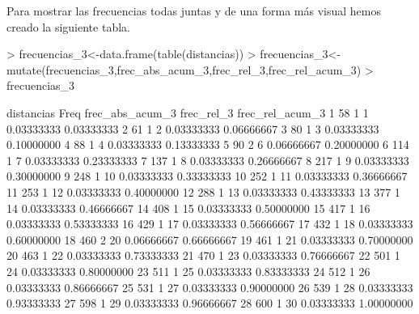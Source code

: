 \documentclass[a4paper]{article}
\begin{document}
Para mostrar las frecuencias todas juntas y de una forma más visual hemos creado la siguiente tabla.
\begin{Schunk}
\begin{Sinput}
> frecuencias_3<-data.frame(table(distancias))
> frecuencias_3<-mutate(frecuencias_3,frec_abs_acum_3,frec_rel_3,frec_rel_acum_3)
> frecuencias_3
\end{Sinput}
\begin{Soutput}
   distancias Freq frec_abs_acum_3 frec_rel_3 frec_rel_acum_3
1          58    1               1 0.03333333      0.03333333
2          61    1               2 0.03333333      0.06666667
3          80    1               3 0.03333333      0.10000000
4          88    1               4 0.03333333      0.13333333
5          90    2               6 0.06666667      0.20000000
6         114    1               7 0.03333333      0.23333333
7         137    1               8 0.03333333      0.26666667
8         217    1               9 0.03333333      0.30000000
9         248    1              10 0.03333333      0.33333333
10        252    1              11 0.03333333      0.36666667
11        253    1              12 0.03333333      0.40000000
12        288    1              13 0.03333333      0.43333333
13        377    1              14 0.03333333      0.46666667
14        408    1              15 0.03333333      0.50000000
15        417    1              16 0.03333333      0.53333333
16        429    1              17 0.03333333      0.56666667
17        432    1              18 0.03333333      0.60000000
18        460    2              20 0.06666667      0.66666667
19        461    1              21 0.03333333      0.70000000
20        463    1              22 0.03333333      0.73333333
21        470    1              23 0.03333333      0.76666667
22        501    1              24 0.03333333      0.80000000
23        511    1              25 0.03333333      0.83333333
24        512    1              26 0.03333333      0.86666667
25        531    1              27 0.03333333      0.90000000
26        539    1              28 0.03333333      0.93333333
27        598    1              29 0.03333333      0.96666667
28        600    1              30 0.03333333      1.00000000
\end{Soutput}
\end{Schunk}
\end{document}
